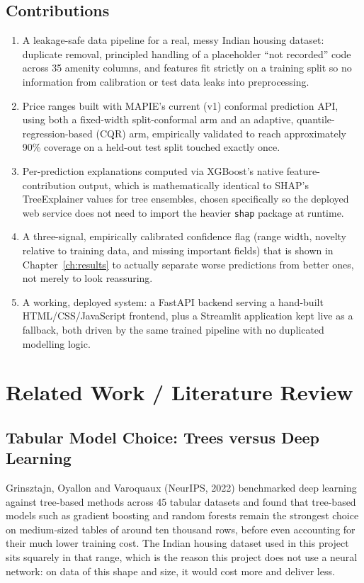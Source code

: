 \documentclass[12pt]{report}
\begin{document}
\section{Contributions}
\begin{enumerate}[label=\arabic*.]
\item A leakage-safe data pipeline for a real, messy Indian housing dataset:
duplicate removal, principled handling of a placeholder ``not recorded'' code across
35 amenity columns, and features fit strictly on a training split so no information
from calibration or test data leaks into preprocessing.
\item Price ranges built with MAPIE's current (v1) conformal prediction API, using
both a fixed-width split-conformal arm and an adaptive, quantile-regression-based
(CQR) arm, empirically validated to reach approximately 90\% coverage on a
held-out test split touched exactly once.
\item Per-prediction explanations computed via XGBoost's native feature-contribution
output, which is mathematically identical to SHAP's TreeExplainer values for tree
ensembles, chosen specifically so the deployed web service does not need to import
the heavier \texttt{shap} package at runtime.
\item A three-signal, empirically calibrated confidence flag (range width, novelty
relative to training data, and missing important fields) that is shown in
Chapter~\ref{ch:results} to actually separate worse predictions from better ones, not
merely to look reassuring.
\item A working, deployed system: a FastAPI backend serving a hand-built HTML/CSS/JavaScript
frontend, plus a Streamlit application kept live as a fallback, both driven by the
same trained pipeline with no duplicated modelling logic.
\end{enumerate}

\chapter{Related Work / Literature Review}

\section{Tabular Model Choice: Trees versus Deep Learning}
Grinsztajn, Oyallon and Varoquaux (NeurIPS, 2022) benchmarked deep learning against
tree-based methods across 45 tabular datasets and found that tree-based models such as
gradient boosting and random forests remain the strongest choice on medium-sized
tables of around ten thousand rows, before even accounting for their much lower
training cost. The Indian housing dataset used in this project sits squarely in that
range, which is the reason this project does not use a neural network: on data of
this shape and size, it would cost more and deliver less.
\end{document}
